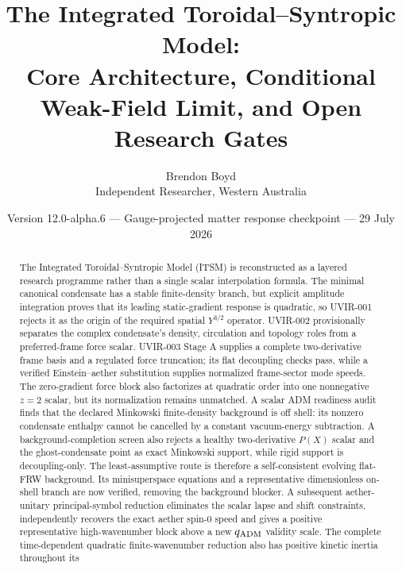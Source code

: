 ﻿\documentclass[11pt]{article}
\title{The Integrated Toroidal--Syntropic Model:\\
Core Architecture, Conditional Weak-Field Limit, and Open Research Gates}
\author{Brendon Boyd\\Independent Researcher, Western Australia}
\date{Version 12.0-alpha.6 --- Gauge-projected matter response checkpoint --- 29 July 2026}
\begin{document}
\maketitle

\begin{center}
\end{center}

\begin{abstract}
The Integrated Toroidal--Syntropic Model (ITSM) is reconstructed as a layered
research programme rather than a single scalar interpolation formula.  The
minimal canonical condensate has a stable finite-density branch, but explicit
amplitude integration proves that its leading static-gradient response is
quadratic, so UVIR-001 rejects it as the origin of the required spatial
$Y^{3/2}$ operator.  UVIR-002 provisionally separates the complex condensate's
density, circulation and topology roles from a preferred-frame force scalar.
UVIR-003 Stage A supplies a complete two-derivative frame basis and a regulated
force truncation; its flat decoupling checks pass, while a verified
Einstein--aether substitution supplies normalized frame-sector mode speeds.
The zero-gradient force block also factorizes at quadratic order into one
nonnegative $z=2$ scalar, but its normalization remains unmatched.  A scalar
ADM readiness audit finds that the declared Minkowski finite-density
background is off shell: its nonzero condensate enthalpy cannot be cancelled
by a constant vacuum-energy subtraction.  A background-completion screen also
rejects a healthy two-derivative $P(X)$ scalar and the ghost-condensate point
as exact Minkowski support, while rigid support is decoupling-only.  The
least-assumptive route is therefore a self-consistent evolving flat-FRW
background.  Its minisuperspace equations and a representative dimensionless
on-shell branch are now verified, removing the background blocker.  A
subsequent aether-unitary principal-symbol reduction eliminates the scalar
lapse and shift constraints, independently recovers the exact aether spin-0
speed and gives a positive representative high-wavenumber block above a new
$q_{\rm ADM}$ validity scale.  The complete time-dependent quadratic
finite-wavenumber reduction also has positive kinetic inertia throughout its

\end{abstract}
\end{document}
